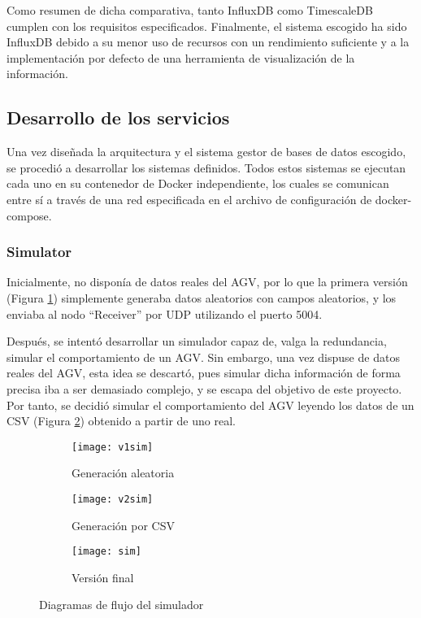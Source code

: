 Como resumen de dicha comparativa, tanto InfluxDB como TimescaleDB cumplen con los requisitos especificados. Finalmente,
el sistema escogido ha sido InfluxDB debido a su menor uso de recursos con un rendimiento suficiente y a 
la implementación por defecto de una herramienta de visualización de la información.

\subsection{Desarrollo de los servicios}

Una vez diseñada la arquitectura y el sistema gestor de bases de datos escogido, se procedió a desarrollar los
sistemas definidos. Todos estos sistemas se ejecutan cada uno en su contenedor de Docker independiente, los cuales 
se comunican entre sí a través de una red especificada en el archivo de configuración de docker-compose.

\subsubsection{Simulator}
Inicialmente, no disponía de datos reales del AGV, por lo que la primera versión (Figura \ref*{fig:v1sim}) simplemente generaba datos aleatorios
con campos aleatorios, y los enviaba al nodo ``Receiver'' por UDP utilizando el puerto 5004.

Después, se intentó desarrollar un simulador capaz de, valga la redundancia, simular el comportamiento de un AGV. Sin
embargo, una vez dispuse de datos reales del AGV, esta idea se descartó, pues simular dicha información de forma
precisa iba a ser demasiado complejo, y se escapa del objetivo de este proyecto. Por tanto, se decidió simular el
comportamiento del AGV leyendo los datos de un CSV (Figura \ref*{fig:v2sim}) obtenido a partir de uno real.

\begin{figure}
    \centering
    \begin{subfigure}[b]{0.45\textwidth}
        \centering
        \texttt{[image: v1sim]}
        \caption{Generación aleatoria}
        \label{fig:v1sim}
    \end{subfigure}
    \hfill
    \begin{subfigure}[b]{0.45\textwidth}
        \centering
        \texttt{[image: v2sim]}
        \caption{Generación por CSV}
        \label{fig:v2sim}
    \end{subfigure}
    \begin{subfigure}[b]{0.7\textwidth}
        \centering
        \texttt{[image: sim]}
        \caption{Versión final}
        \label{fig:sim}
    \end{subfigure}
    \caption{Diagramas de flujo del simulador}
    \label{fig:diagsim}
\end{figure}

